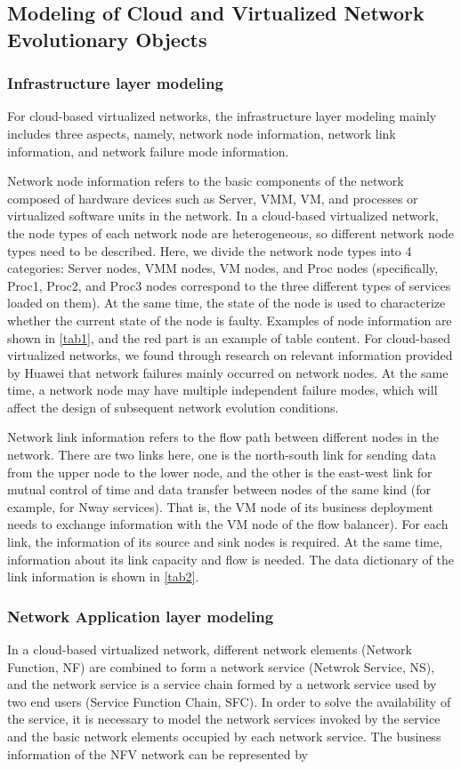 \documentclass[journal]{IEEEtran}
\begin{document}
    \subsection{Modeling of Cloud and Virtualized Network Evolutionary Objects}

    \subsubsection{Infrastructure layer modeling}
    For cloud-based virtualized networks, the infrastructure layer modeling mainly includes three aspects, namely, network node information, network link information, and network failure mode information.


    Network node information refers to the basic components of the network composed of hardware devices such as Server, VMM, VM, and processes or virtualized software units in the network. In a cloud-based virtualized network, the node types of each network node are heterogeneous, so different network node types need to be described. Here, we divide the network node types into 4 categories: Server nodes, VMM nodes, VM nodes, and Proc nodes (specifically, Proc1, Proc2, and Proc3 nodes correspond to the three different types of services loaded on them). At the same time, the state of the node is used to characterize whether the current state of the node is faulty. Examples of node information are shown in \ref{tab1}, and the red part is an example of table content. For cloud-based virtualized networks, we found through research on relevant information provided by Huawei that network failures mainly occurred on network nodes. At the same time, a network node may have multiple independent failure modes, which will affect the design of subsequent network evolution conditions.

    Network link information refers to the flow path between different nodes in the network. There are two links here, one is the north-south link for sending data from the upper node to the lower node, and the other is the east-west link for mutual control of time and data transfer between nodes of the same kind (for example, for Nway services). That is, the VM node of its business deployment needs to exchange information with the VM node of the flow balancer). For each link, the information of its source and sink nodes is required. At the same time, information about its link capacity and flow is needed. The data dictionary of the link information is shown in \ref{tab2}.

    \subsubsection{Network Application layer modeling}
    In a cloud-based virtualized network, different network elements (Network Function, NF) are combined to form a network service (Netwrok Service, NS), and the network service is a service chain formed by a network service used by two end users  (Service Function Chain, SFC). In order to solve the availability of the service, it is necessary to model the network services invoked by the service and the basic network elements occupied by each network service. The business information of the NFV network can be represented by 
\end{document}
